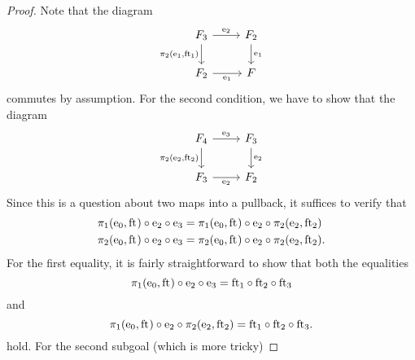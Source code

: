 \begin{proof}
Note that the diagram
\begin{equation*}
\begin{tikzcd}
\stesysf_3
  \ar{d}[swap]{\pullbackpr{2}{\efamext}{\eft[1]}}
  \ar{r}{\eext{2}}
  & 
\stesysf_2 
  \ar{d}{\efamext} 
  \\
\stesysf_2 
  \ar{r}[swap]{\efamext} 
  &
\stesysf
\end{tikzcd}
\end{equation*}
commutes by assumption. For the second condition, we have to show that the
diagram
\begin{equation*}
\begin{tikzcd}
\stesysf_4
  \ar{d}[swap]{\pullbackpr{2}{\eext{2}}{\eft[2]}}
  \ar{r}{\eext{3}}
  & 
\stesysf_3
  \ar{d}{\eext{2}} 
  \\
\stesysf_3
  \ar{r}[swap]{\eext{2}} 
  &
\stesysf_2
\end{tikzcd}
\end{equation*}
Since this is a question about two maps into a pullback, it suffices to verify
that
\begin{align*}
\pullbackpr{1}{\ectxext}{\eft}\circ\eext{2}\circ\eext{3}
  & =
\pullbackpr{1}{\ectxext}{\eft}\circ\eext{2}\circ\pullbackpr{2}{\eext{2}}{\eft[2]}
  \\
\pullbackpr{2}{\ectxext}{\eft}\circ\eext{2}\circ\eext{3}
  & =
\pullbackpr{2}{\ectxext}{\eft}\circ\eext{2}\circ\pullbackpr{2}{\eext{2}}{\eft[2]}.
\end{align*}
For the first equality, it is fairly straightforward to show that both the
equalities
\begin{equation*}
\pullbackpr{1}{\ectxext}{\eft}\circ\eext{2}\circ\eext{3}
  =
\eft[1]\circ\eft[2]\circ\eft[3]
\end{equation*}
and
\begin{equation*}
\pullbackpr{1}{\ectxext}{\eft}\circ\eext{2}\circ\pullbackpr{2}{\eext{2}}{\eft[2]}
  =
\eft[1]\circ\eft[2]\circ\eft[3].
\end{equation*}
hold. For the second subgoal (which is more tricky)
\begin{comment}
 Note that we have isomorphisms $\alpha_2$ and $\alpha_3$, which
are unique with the property that they render their respective diagram commutative:
\begin{equation*}
\begin{tikzcd}[column sep=large]
{}&
  \pullback{\stesysf_2}{\stesysf}{\ectxext\circ\efamext}{\eft}
  \ar[bend left=10]{drr}{\pullbackpr{2}{\ectxext\circ\efamext}{\eft}}

\end{comment}
\end{proof}
